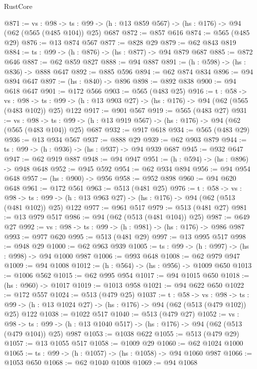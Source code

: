 \begin{lexlean}{RustCore}
\begin{coremodule}
@871 := {vs : @98} ->
  {ts : @99} -> (h : @13 @859 @567) -> (hs : @176) -> @94 (@62 (@565 (@485 @104)) @25) @687
@872 := @857 @616
@874 := @565 (@485 @29)
@876 := @13 @874 @567
@877 := @828 @29
@879 := @62 @843 @819
@884 := {ts : @99} -> (h : @876) -> (hs : @877) -> @94 @879 @687
@885 := @872 @646
@887 := @62 @859 @827
@888 := @94 @887
@891 := (h : @598) -> (hs : @836) -> @888 @647
@892 := @885 @596
@894 := @62 @874 @834
@896 := @94 @894 @647
@897 := (hs : @840) -> @896
@898 := @892 @838
@900 := @94 @618 @647
@901 := @172 @566
@903 := @565 (@483 @25)
@916 := {t : @58} ->
  {vs : @98} ->
  {ts : @99} -> (h : @13 @903 @27) -> (hs : @176) -> @94 (@62 (@565 (@483 @102)) @25) @122
@917 := @901 @567
@919 := @565 (@483 @27)
@931 := {vs : @98} ->
  {ts : @99} -> (h : @13 @919 @567) -> (hs : @176) -> @94 (@62 (@565 (@483 @104)) @25) @687
@932 := @917 @618
@934 := @565 (@483 @29)
@936 := @13 @934 @567
@937 := @888 @29
@939 := @62 @903 @879
@944 := {ts : @99} -> (h : @936) -> (hs : @937) -> @94 @939 @687
@945 := @932 @647
@947 := @62 @919 @887
@948 := @94 @947
@951 := (h : @594) -> (hs : @896) -> @948 @648
@952 := @945 @592
@954 := @62 @934 @894
@956 := @94 @954 @648
@957 := (hs : @900) -> @956
@958 := @952 @898
@960 := @94 @620 @648
@961 := @172 @561
@963 := @513 (@481 @25)
@976 := {t : @58} ->
  {vs : @98} ->
  {ts : @99} -> (h : @13 @963 @27) -> (hs : @176) -> @94 (@62 (@513 (@481 @102)) @25) @122
@977 := @961 @517
@979 := @513 (@481 @27)
@981 := @13 @979 @517
@986 := @94 (@62 (@513 (@481 @104)) @25)
@987 := @649 @27
@992 := {vs : @98} -> {ts : @99} -> (h : @981) -> (hs : @176) -> @986 @987
@993 := @977 @620
@995 := @513 (@481 @29)
@997 := @13 @995 @517
@998 := @948 @29
@1000 := @62 @963 @939
@1005 := {ts : @99} -> (h : @997) -> (hs : @998) -> @94 @1000 @987
@1006 := @993 @648
@1008 := @62 @979 @947
@1009 := @94 @1008
@1012 := (h : @564) -> (hs : @956) -> @1009 @650
@1013 := @1006 @562
@1015 := @62 @995 @954
@1017 := @94 @1015 @650
@1018 := (hs : @960) -> @1017
@1019 := @1013 @958
@1021 := @94 @622 @650
@1022 := @172 @557
@1024 := @513 (@479 @25)
@1037 := {t : @58} ->
  {vs : @98} ->
  {ts : @99} -> (h : @13 @1024 @27) -> (hs : @176) -> @94 (@62 (@513 (@479 @102)) @25) @122
@1038 := @1022 @517
@1040 := @513 (@479 @27)
@1052 := {vs : @98} ->
  {ts : @99} -> (h : @13 @1040 @517) -> (hs : @176) -> @94 (@62 (@513 (@479 @104)) @25) @987
@1053 := @1038 @622
@1055 := @513 (@479 @29)
@1057 := @13 @1055 @517
@1058 := @1009 @29
@1060 := @62 @1024 @1000
@1065 := {ts : @99} -> (h : @1057) -> (hs : @1058) -> @94 @1060 @987
@1066 := @1053 @650
@1068 := @62 @1040 @1008
@1069 := @94 @1068

\end{coremodule}
\end{lexlean}
